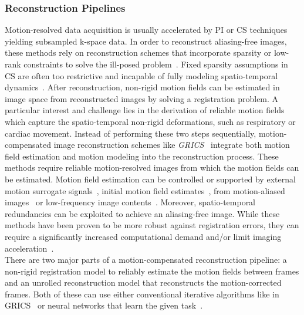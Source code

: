 \subsubsection{Reconstruction Pipelines} \label{SubSubSec:ReconstructionPipelines}
Motion-resolved data acquisition is usually accelerated by PI or CS techniques yielding subsampled k-space data. In order to reconstruct aliasing-free images, these methods rely on reconstruction schemes that incorporate sparsity or low-rank constraints to solve the ill-posed problem~\cite{CS-MRI,ParallelMRI,LowRank+SparseMRI}. Fixed sparsity assumptions in CS are often too restrictive and incapable of fully modeling spatio-temporal dynamics~\cite{Kuestner2022}. 
After reconstruction, non-rigid motion fields can be estimated in image space from reconstructed images by solving a registration problem. A particular interest and challenge lies in the derivation of reliable motion fields which capture the spatio-temporal non-rigid deformations, such as respiratory or cardiac movement. Instead of performing these two steps sequentially, motion-compensated image reconstruction schemes like \emph{GRICS}~\cite{GRICS} integrate both motion field estimation and motion modeling into the reconstruction process. These methods require reliable motion-resolved images from which the motion fields can be estimated. Motion field estimation can be controlled or supported by external motion surrogate signals~\cite{CorderoGrande2016}, initial motion field estimates~\cite{Atkinson1997,Batchelor2005}, from motion-aliased images~\cite{Haskell2019} or low-frequency image contents~\cite{Usman2020}. Moreover, spatio-temporal redundancies can be exploited to achieve an aliasing-free image. While these methods have been proven to be more robust against registration errors, they can require a significantly increased computational demand and/or limit imaging acceleration~\cite{Kuestner2022}.\\
There are two major parts of a motion-compensated reconstruction pipeline: a non-rigid registration model to reliably estimate the motion fields between frames and an unrolled reconstruction model that reconstructs the motion-corrected frames. Both of these can use either conventional iterative algorithms like in GRICS~\cite{GRICS} or neural networks that learn the given task~\cite{Kuestner2022}.


